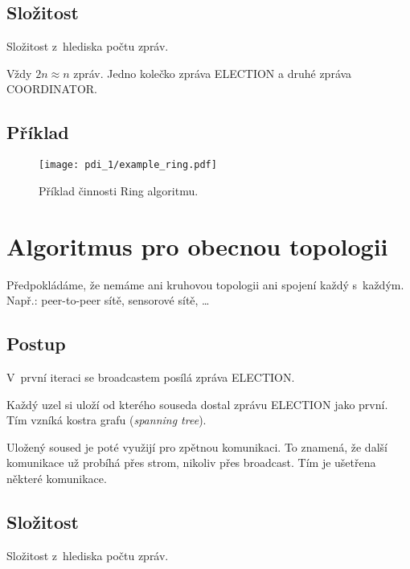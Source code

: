 \subsection*{Složitost}

Složitost z~hlediska počtu zpráv.

\bigskip\noindent Vždy $2n \approx n$ zpráv. Jedno kolečko  zpráva ELECTION a druhé zpráva COORDINATOR.

\subsection*{Příklad}

\begin{figure}[H]
    \centering
    \texttt{[image: pdi\_1/example\_ring.pdf]}
    \caption{Příklad činnosti Ring algoritmu.}
\end{figure}


\section{Algoritmus pro obecnou topologii}

Předpokládáme, že nemáme ani kruhovou topologii ani spojení každý s~každým. Např.: peer-to-peer sítě, sensorové sítě, \dots

\subsection*{Postup}

\begin{compactitem}
    \item V~první iteraci se broadcastem posílá zpráva ELECTION.
    \item Každý uzel si uloží od kterého souseda dostal zprávu ELECTION jako první. Tím vzníká kostra grafu (\textit{spanning tree}).
    \item Uložený soused je poté využijí pro zpětnou komunikaci. To znamená, že další komunikace už probíhá přes strom, nikoliv přes broadcast. Tím je ušetřena některé komunikace.
\end{compactitem}

\subsection*{Složitost}

Složitost z~hlediska počtu zpráv.

